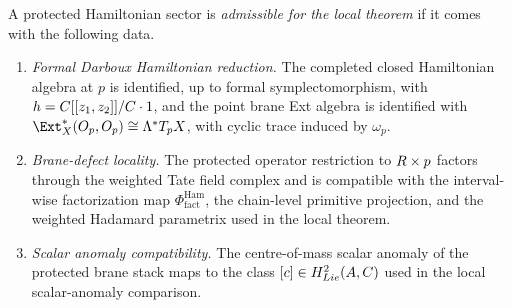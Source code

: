 \begin{defn}\label{defn:admissible-protected-hamiltonian-restriction}
  A protected Hamiltonian sector is \emph{admissible for the local
  theorem} if it comes with the following data.
  \begin{enumerate}[label=(\roman*)]
    \item \emph{Formal Darboux Hamiltonian reduction.}  The completed
      closed Hamiltonian algebra at $p$ is identified, up to formal
      symplectomorphism, with
      $h=C[[z_1,z_2]]/C\cdot 1$, and the point
      brane Ext algebra is identified with
      $\Ext_X^*(\mc O_p,\mc O_p)\cong\Lambda^*T_pX$, with cyclic trace
      induced by $\omega_p$.
    \item \emph{Brane-defect locality.}  The protected operator
      restriction to $R\times p$ factors through the weighted Tate
      field complex and is compatible with the interval-wise
      factorization map
      $\Phi^{\mathrm{Ham}}_{\mathrm{fact}}$, the chain-level
      primitive projection, and the weighted Hadamard parametrix used
      in the local theorem.
    \item \emph{Scalar anomaly compatibility.}  The centre-of-mass
      scalar anomaly of the protected brane stack maps to the class
      $[c]\in H^2_{Lie}(A,C)$ used in the local
      scalar-anomaly comparison.
  \end{enumerate}
\end{defn}


